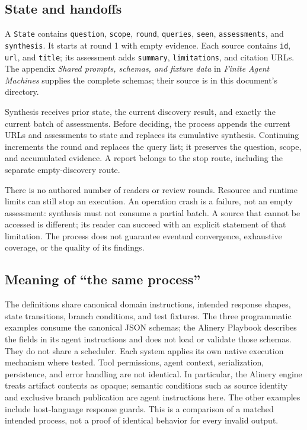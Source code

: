 \documentclass[11pt,letterpaper]{article}
\newcommand{\file}[1]{\texttt{\detokenize{#1}}}
\begin{document}
\subsection{State and handoffs}
A \texttt{State} contains \texttt{question}, \texttt{scope}, \texttt{round}, \texttt{queries}, \texttt{seen}, \texttt{assessments}, and \texttt{synthesis}. It starts at round 1 with empty evidence. Each source contains \texttt{id}, \texttt{url}, and \texttt{title}; its assessment adds \texttt{summary}, \texttt{limitations}, and citation URLs. The appendix \emph{Shared prompts, schemas, and fixture data} in \emph{Finite Agent Machines} supplies the complete schemas; their source is \file{shared/schemas.json} in this document's directory.

Synthesis receives prior state, the current discovery result, and exactly the current batch of assessments. Before deciding, the process appends the current URLs and assessments to state and replaces its cumulative synthesis. Continuing increments the round and replaces the query list; it preserves the question, scope, and accumulated evidence. A report belongs to the stop route, including the separate empty-discovery route.

There is no authored number of readers or review rounds. Resource and runtime limits can still stop an execution. An operation crash is a failure, not an empty assessment: synthesis must not consume a partial batch. A source that cannot be accessed is different; its reader can succeed with an explicit statement of that limitation. The process does not guarantee eventual convergence, exhaustive coverage, or the quality of its findings.

\subsection{Meaning of ``the same process''}
The definitions share canonical domain instructions, intended response shapes, state transitions, branch conditions, and test fixtures. The three programmatic examples consume the canonical JSON schemas; the Alinery Playbook describes the fields in its agent instructions and does not load or validate those schemas. They do not share a scheduler. Each system applies its own native execution mechanism where tested. Tool permissions, agent context, serialization, persistence, and error handling are not identical. In particular, the Alinery engine treats artifact contents as opaque; semantic conditions such as source identity and exclusive branch publication are agent instructions here. The other examples include host-language response guards. This is a comparison of a matched intended process, not a proof of identical behavior for every invalid output.
\end{document}
